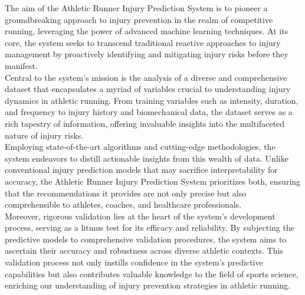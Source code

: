 \documentclass[12pt, English]{article}
\newcommand\tab[1][1cm]{\hspace*{#1}}
\begin{document}
\begin{normalsize}
\begin{normalsize}
\tab The aim of the Athletic Runner Injury Prediction System is to pioneer a groundbreaking approach to injury prevention in the realm of competitive running, leveraging the power of advanced machine learning techniques. At its core, the system seeks to transcend traditional reactive approaches to injury management by proactively identifying and mitigating injury risks before they manifest.\\

\tab Central to the system's mission is the analysis of a diverse and comprehensive dataset that encapsulates a myriad of variables crucial to understanding injury dynamics in athletic running. From training variables such as intensity, duration, and frequency to injury history and biomechanical data, the dataset serves as a rich tapestry of information, offering invaluable insights into the multifaceted nature of injury risks.\\

\tab Employing state-of-the-art algorithms and cutting-edge methodologies, the system endeavors to distill actionable insights from this wealth of data. Unlike conventional injury prediction models that may sacrifice interpretability for accuracy, the Athletic Runner Injury Prediction System prioritizes both, ensuring that the recommendations it provides are not only precise but also comprehensible to athletes, coaches, and healthcare professionals.\\

\tab Moreover, rigorous validation lies at the heart of the system's development process, serving as a litmus test for its efficacy and reliability. By subjecting the predictive models to comprehensive validation procedures, the system aims to ascertain their accuracy and robustness across diverse athletic contexts. This validation process not only instills confidence in the system's predictive capabilities but also contributes valuable knowledge to the field of sports science, enriching our understanding of injury prevention strategies in athletic running.\\


\end{normalsize}
\end{normalsize}
\end{document}
